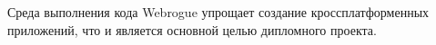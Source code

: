 
Среда выполнения кода Webrogue упрощает создание кроссплатформенных приложений, что и является основной целью дипломного проекта.
